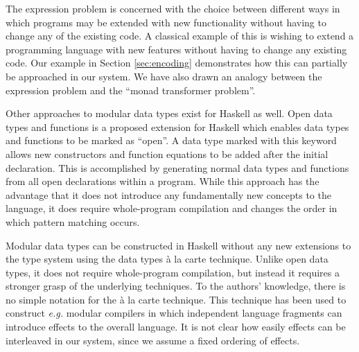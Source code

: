 The expression problem is concerned with the choice between different ways in which programs may be extended with new functionality without having to change any of the existing code. A classical example of this is wishing to extend a programming language with new features without having to change any existing code. Our example in Section \ref{sec:encoding} demonstrates how this can partially be approached in our system. We have also drawn an analogy between the expression problem and the ``monad transformer problem''. 

Other approaches to modular data types exist for Haskell as well. Open data types and functions is a proposed extension for Haskell which enables data types and functions to be marked as ``open''. A data type marked with this keyword allows new constructors and function equations to be added after the initial declaration. This is accomplished by generating normal data types and functions from all open declarations within a program. While this approach has the advantage that it does not introduce any fundamentally new concepts to the language, it does require whole-program compilation and changes the order in which pattern matching occurs\cite{loh2006open}.

Modular data types can be constructed in Haskell without any new extensions to the type system using the data types \`a la carte technique\cite{swierstra2008data}. Unlike open data types, it does not require whole-program compilation, but instead it requires a stronger grasp of the underlying techniques. To the authors' knowledge, there is no simple notation for the \`a la carte technique. This technique has been used to construct \emph{e.g.} modular compilers in which independent language fragments can introduce effects to the overall language\cite{day2012towards}. It is not clear how easily effects can be interleaved in our system, since we assume a fixed ordering of effects.


